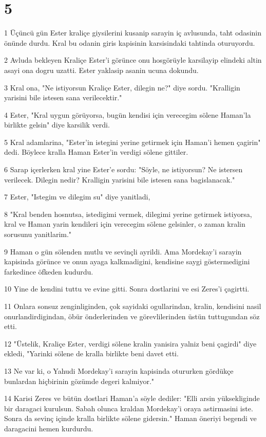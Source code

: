 \chapter{5}

\par 1 Üçüncü gün Ester kraliçe giysilerini kusanip sarayin iç avlusunda, taht odasinin önünde durdu. Kral bu odanin giris kapisinin karsisindaki tahtinda oturuyordu.
\par 2 Avluda bekleyen Kraliçe Ester'i görünce onu hosgörüyle karsilayip elindeki altin asayi ona dogru uzatti. Ester yaklasip asanin ucuna dokundu.
\par 3 Kral ona, "Ne istiyorsun Kraliçe Ester, dilegin ne?" diye sordu. "Kralligin yarisini bile istesen sana verilecektir."
\par 4 Ester, "Kral uygun görüyorsa, bugün kendisi için verecegim sölene Haman'la birlikte gelsin" diye karsilik verdi.
\par 5 Kral adamlarina, "Ester'in istegini yerine getirmek için Haman'i hemen çagirin" dedi. Böylece kralla Haman Ester'in verdigi sölene gittiler.
\par 6 Sarap içerlerken kral yine Ester'e sordu: "Söyle, ne istiyorsun? Ne istersen verilecek. Dilegin nedir? Kralligin yarisini bile istesen sana bagislanacak."
\par 7 Ester, "Istegim ve dilegim su" diye yanitladi,
\par 8 "Kral benden hosnutsa, istedigimi vermek, dilegimi yerine getirmek istiyorsa, kral ve Haman yarin kendileri için verecegim sölene gelsinler, o zaman kralin sorusunu yanitlarim."
\par 9 Haman o gün sölenden mutlu ve sevinçli ayrildi. Ama Mordekay'i sarayin kapisinda görünce ve onun ayaga kalkmadigini, kendisine saygi göstermedigini farkedince öfkeden kudurdu.
\par 10 Yine de kendini tuttu ve evine gitti. Sonra dostlarini ve esi Zeres'i çagirtti.
\par 11 Onlara sonsuz zenginliginden, çok sayidaki ogullarindan, kralin, kendisini nasil onurlandirdigindan, öbür önderlerinden ve görevlilerinden üstün tuttugundan söz etti.
\par 12 "Üstelik, Kraliçe Ester, verdigi sölene kralin yanisira yalniz beni çagirdi" diye ekledi, "Yarinki sölene de kralla birlikte beni davet etti.
\par 13 Ne var ki, o Yahudi Mordekay'i sarayin kapisinda otururken gördükçe bunlardan hiçbirinin gözümde degeri kalmiyor."
\par 14 Karisi Zeres ve bütün dostlari Haman'a söyle dediler: "Elli arsin yüksekliginde bir daragaci kurulsun. Sabah olunca kraldan Mordekay'i oraya astirmasini iste. Sonra da sevinç içinde kralla birlikte sölene gidersin." Haman öneriyi begendi ve daragacini hemen kurdurdu.

